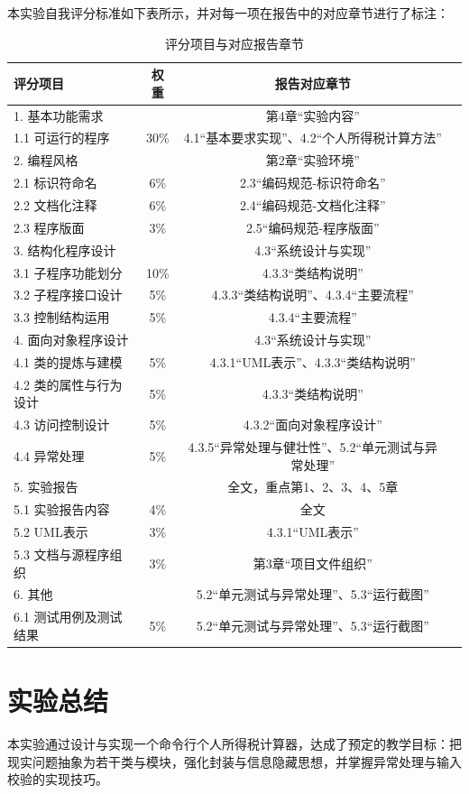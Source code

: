本实验自我评分标准如下表所示，并对每一项在报告中的对应章节进行了标注：


\begin{table}[htbp]
	\centering
	\begin{tabular}{|p{5cm}|c|c|p{5.5cm}|}
	\hline
	评分项目 & 权重 & 报告对应章节 \\
	\hline 
	 1. 基本功能需求 & & 第4章“实验内容” \\
	 1.1 可运行的程序 & 30\% & 4.1“基本要求实现”、4.2“个人所得税计算方法” \\
	 2. 编程风格  &  & 第2章“实验环境” \\
	2.1 标识符命名 & 6\% & 2.3“编码规范-标识符命名” \\
	2.2 文档化注释 & 6\% & 2.4“编码规范-文档化注释” \\
	2.3 程序版面 & 3\% & 2.5“编码规范-程序版面” \\
	3. 结构化程序设计&  & 4.3“系统设计与实现” \\
	3.1 子程序功能划分 & 10\% & 4.3.3“类结构说明” \\
	3.2 子程序接口设计 & 5\% & 4.3.3“类结构说明”、4.3.4“主要流程” \\
	3.3 控制结构运用 & 5\% & 4.3.4“主要流程” \\
	4. 面向对象程序设计&   & 4.3“系统设计与实现” \\
	4.1 类的提炼与建模 & 5\% & 4.3.1“UML表示”、4.3.3“类结构说明” \\
	4.2 类的属性与行为设计 & 5\% & 4.3.3“类结构说明” \\
	4.3 访问控制设计 & 5\% & 4.3.2“面向对象程序设计” \\
	4.4 异常处理 & 5\% & 4.3.5“异常处理与健壮性”、5.2“单元测试与异常处理” \\
	5. 实验报告&   & 全文，重点第1、2、3、4、5章 \\
	5.1 实验报告内容 & 4\% & 全文 \\
	5.2 UML表示 & 3\% & 4.3.1“UML表示” \\
	5.3 文档与源程序组织 & 3\% & 第3章“项目文件组织” \\
	6. 其他&  & 5.2“单元测试与异常处理”、5.3“运行截图” \\
	6.1 测试用例及测试结果 & 5\% & 5.2“单元测试与异常处理”、5.3“运行截图” \\
	\hline
	\end{tabular}
	\caption{评分项目与对应报告章节}
	\label{tab:self-eval-map}
\end{table}


\chapter{实验总结}
本实验通过设计与实现一个命令行个人所得税计算器，达成了预定的教学目标：把现实问题抽象为若干类与模块，强化封装与信息隐藏思想，并掌握异常处理与输入校验的实现技巧。

